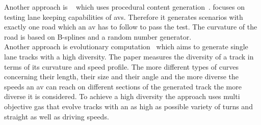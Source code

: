 Another approach is \asfault{}~\cite{asfault} which uses procedural content generation~\cite{proceduralContentGeneration}.
\asfault{} focuses on testing lane keeping capabilities of \glspl{av}.
Therefore it generates scenarios with exactly one road which an \gls{av} has to follow to pass the test.
The curvature of the road is based on B-splines and a random number generator.\\
Another approach is evolutionary computation~\cite{generationForRacingGames} which aims to generate single lane tracks with a high diversity.
The paper measures the diversity of a track in terms of its curvature and speed profile.
The more different types of curves concerning their length, their size and their angle and the more diverse the speeds an \gls{av} can reach on different sections of the generated track the more diverse it is considered.
To achieve a high diversity the approach uses multi objective \glspl{ga} that evolve tracks with an as high as possible variety of turns and straight as well as driving speeds.

